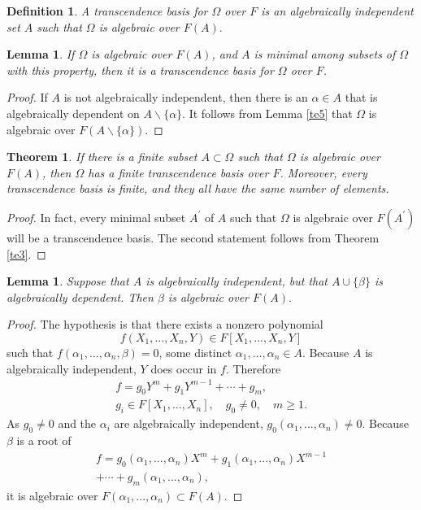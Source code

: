 \documentclass[a4paper,11pt,final,openany]{memoir}
\newtheorem{lemma}[X]{Lemma}
\newtheorem{theorem}[X]{Theorem}
\newtheorem{definition}[X]{Definition}
\theoremstyle{nonumberplain}
\newtheorem{proof}{Proof.}
\begin{document}
\begin{definition}
\label{te6}A \emph{transcendence basis}%
%
\emph{\/} for $\Omega$ over $F$ is an algebraically independent set $A$ such
that $\Omega$ is algebraic over $F(A).$
\end{definition}

\begin{lemma}
\label{te7}If $\Omega$ is algebraic over $F(A)$, and $A$ is minimal among
subsets of $\Omega$ with this property, then it is a transcendence basis for
$\Omega$ over $F$.
\end{lemma}

\begin{proof}
If $A$ is not algebraically independent, then there is an $\alpha\in A$ that
is algebraically dependent on $A\smallsetminus\{\alpha\}$. It follows from
Lemma \ref{te5} that $\Omega$ is algebraic over $F(A\smallsetminus
\{\alpha\}).$
\end{proof}

\begin{theorem}
\label{te8}If there is a finite subset $A\subset\Omega$ such that $\Omega$ is
algebraic over $F(A)$, then $\Omega$ has a finite transcendence basis over
$F$. Moreover, every transcendence basis is finite, and they all have the same
number of elements.
\end{theorem}

\begin{proof}
In fact, every minimal subset $A^{\prime}$ of $A$ such that $\Omega$ is
algebraic over $F(A^{\prime})$ will be a transcendence basis. The second
statement follows from Theorem \ref{te3}.
\end{proof}

\begin{lemma}
\label{te11}Suppose that $A$ is algebraically independent, but that
$A\cup\{\beta\}$ is algebraically dependent. Then $\beta$ is algebraic over
$F(A).$
\end{lemma}

\begin{proof}
The hypothesis is that there exists a nonzero polynomial
\[
f(X_{1},...,X_{n},Y)\in F[X_{1},...,X_{n},Y]
\]
such that $f(\alpha_{1},...,\alpha_{n},\beta)=0$, some distinct $\alpha
_{1},...,\alpha_{n}\in A$. Because $A$ is algebraically independent, $Y$ does
occur in $f$. Therefore
\begin{align*}
f=g_{0}Y^{m}+g_{1}Y^{m-1}+\cdots+g_{m},\\
 g_{i}\in F[X_{1},...,X_{n}],\quad
g_{0}\neq0,\quad m\geq1.
\end{align*}
As $g_{0}\neq0$ and the $\alpha_{i}$ are algebraically independent,
$g_{0}(\alpha_{1},...,\alpha_{n})\neq0$. Because $\beta$ is a root of
\begin{align*}
f=g_{0}(\alpha_{1},...,\alpha_{n})X^{m}+g_{1}(\alpha_{1},...,\alpha
_{n})X^{m-1}\\
+\cdots+g_{m}(\alpha_{1},...,\alpha_{n}),
\end{align*}
it is algebraic over $F(\alpha_{1},...,\alpha_{n})\subset F(A).$
\end{proof}
\end{document}
